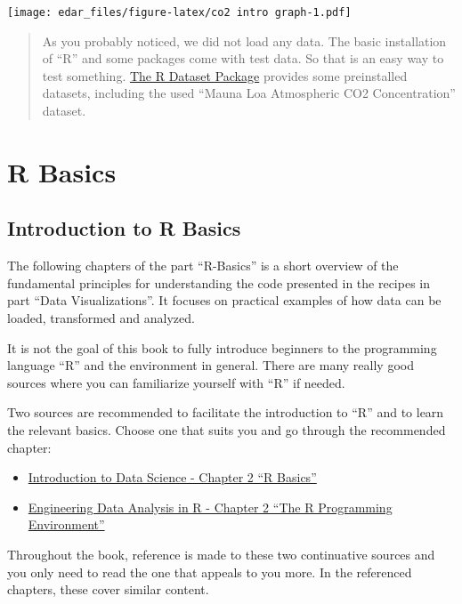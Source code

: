 \documentclass[
]{book}
\providecommand{\tightlist}{%
  \setlength{\itemsep}{0pt}\setlength{\parskip}{0pt}}
\begin{document}
\texttt{[image: edar\_files/figure-latex/co2 intro graph-1.pdf]}

\begin{quote}
As you probably noticed, we did not load any data. The basic installation of ``R'' and some packages come with test data. So that is an easy way to test something. \href{https://stat.ethz.ch/R-manual/R-devel/library/datasets/html/00Index.html}{The R Dataset Package} provides some preinstalled datasets, including the used ``Mauna Loa Atmospheric CO2 Concentration'' dataset.
\end{quote}

\hypertarget{part-r-basics}{%
\part{R Basics}\label{part-r-basics}}

\hypertarget{introduction-to-r-basics}{%
\chapter{Introduction to R Basics}\label{introduction-to-r-basics}}

The following chapters of the part ``R-Basics'' is a short overview of the fundamental principles for understanding the code presented in the recipes in part ``Data Visualizations''. It focuses on practical examples of how data can be loaded, transformed and analyzed.

It is not the goal of this book to fully introduce beginners to the programming language ``R'' and the environment in general. There are many really good sources where you can familiarize yourself with ``R'' if needed.

Two sources are recommended to facilitate the introduction to ``R'' and to learn the relevant basics. Choose one that suits you and go through the recommended chapter:

\begin{itemize}
\tightlist
\item
  \href{https://rafalab.github.io/dsbook/r-basics.html}{Introduction to Data Science - Chapter 2 ``R Basics''}
\item
  \href{https://smogdr.github.io/edar_coursebook/rprog1.html}{Engineering Data Analysis in R - Chapter 2 ``The R Programming Environment''}
\end{itemize}

Throughout the book, reference is made to these two continuative sources and you only need to read the one that appeals to you more. In the referenced chapters, these cover similar content.
\end{document}
